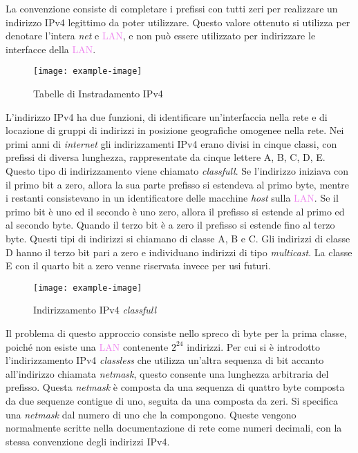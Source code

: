 \documentclass{article}
\numberwithin{equation}{subsection}
\begin{document}
La convenzione consiste di completare i prefissi con tutti zeri per realizzare un indirizzo \textcolor{BurntOrange}{IPv4} legittimo da poter utilizzare. Questo valore ottenuto si utilizza per 
denotare l'intera \textit{net} e \textcolor{violet}{LAN}, e non può essere utilizzato per indirizzare le interfacce della \textcolor{violet}{LAN}. 

\begin{figure}[H]%
    \centering%
    \texttt{[image: example-image]}%
    \caption{Tabelle di Instradamento \textcolor{BurntOrange}{IPv4}}%
\end{figure}

L'indirizzo \textcolor{BurntOrange}{IPv4} ha due funzioni, di identificare un'interfaccia nella rete e di locazione di gruppi di indirizzi in posizione geografiche omogenee nella rete. 
Nei primi anni di \textit{internet} gli indirizzamenti \textcolor{BurntOrange}{IPv4} erano divisi in cinque classi, con prefissi di diversa lunghezza, rappresentate da cinque lettere A, B, C, D, E. Questo tipo di indirizzamento viene chiamato \textit{classfull}. 
Se l'indirizzo iniziava con il primo bit a zero, allora la sua parte prefisso si estendeva al primo byte, mentre i restanti consistevano in un identificatore delle macchine \textit{host} sulla 
\textcolor{violet}{LAN}. Se il primo bit è uno ed il secondo è uno zero, allora il prefisso si estende al primo ed al secondo byte. Quando il terzo bit è a zero il prefisso si 
estende fino al terzo byte. Questi tipi di indirizzi si chiamano di classe A, B e C. Gli indirizzi di classe D hanno il terzo bit pari a zero e individuano 
indirizzi di tipo \textit{multicast}. La classe E con il quarto bit a zero venne riservata invece per usi futuri. 


\begin{figure}[H]%
    \centering%
    \texttt{[image: example-image]}%
    \caption{Indirizzamento \textcolor{BurntOrange}{IPv4} \textit{classfull}}%
\end{figure}


Il problema di questo approccio consiste nello spreco di byte per la prima classe, poiché non esiste una \textcolor{violet}{LAN} contenente $2^{24}$ indirizzi. Per cui si è introdotto 
l'indirizzamento \textcolor{BurntOrange}{IPv4} \textit{classless} che utilizza un'altra sequenza di bit accanto all'indirizzo chiamata \textit{netmask}, questo consente una lunghezza arbitraria del prefisso. Questa \textit{netmask} è composta da una sequenza di quattro byte composta da due sequenze contigue di uno, seguita da una composta da zeri. Si specifica una \textit{netmask} dal numero di uno che la compongono. Queste vengono normalmente scritte nella documentazione di rete come numeri decimali, 
con la stessa convenzione degli indirizzi \textcolor{BurntOrange}{IPv4}. 
\end{document}
